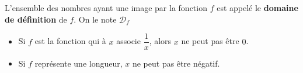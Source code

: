 \documentclass[
	classe=$2^{de}$,
	headerTitle=Cours\space Chapitre\space 7
]{coursclass}
\begin{document}
\begin{definition}
	L'ensemble des nombres ayant une image par la fonction $f$ est appelé le \textbf{domaine de définition} de $f$. On le note $𝒟_f$
\end{definition}

\begin{exemple}
	\begin{itemize}
		\item Si $f$ est la fonction qui à $x$ associe $\dfrac{1}{x}$, alors $x$ ne peut pas être $0$.
		\item Si $f$ représente une longueur, $x$ ne peut pas être négatif.
	\end{itemize}
\end{exemple}
\end{document}
